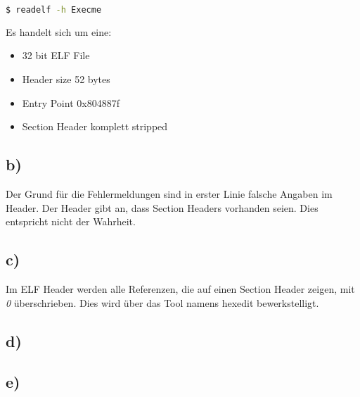 \begin{lstlisting}[language=bash]
    $ readelf -h Execme
\end{lstlisting}

Es handelt sich um eine:
\begin{itemize}
    \item 32 bit ELF File
    \item Header size 52 bytes
    \item Entry Point 0x804887f
    \item Section Header komplett stripped
\end{itemize}

\subsection*{b)}

Der Grund für die Fehlermeldungen sind in erster Linie falsche Angaben im Header. Der Header
gibt an, dass Section Headers vorhanden seien. Dies entspricht nicht der Wahrheit.

\subsection*{c)}

Im ELF Header werden alle Referenzen, die auf einen Section Header zeigen, mit \textit{0} überschrieben.
Dies wird über das Tool namens hexedit bewerkstelligt.

\subsection*{d)}



\subsection*{e)}

